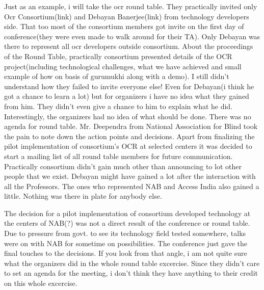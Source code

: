 Just as an example, i will take the ocr round table. They practically invited only Ocr Consortium(link) and Debayan Banerjee(link) from technology developers side. That too most of the consortium members got invite on the first day of conference(they were even made to walk around for their TA). Only Debayan was there to represent all ocr developers outside consortium. About the proceedings of the Round Table, practically consortium presented details of the OCR project(including technological challenges, what we have achieved and small example of how on basis of gurumukhi along with a demo). I still didn't understand how they failed to invite everyone else! Even for Debayan(i think he got a chance to learn a lot) but for organizers i have no idea what they gained from him. They didn't even give a chance to him to explain what he did. Interestingly, the organizers had no idea of what should be done. There was no agenda for round table. Mr. Deependra from National Association for Blind took the pain to note down the action points and decisions. Apart from finalizing the pilot implementation of consortium's OCR at selected centers it was decided to start a mailing list of all round table members for future communication. Practically consortium didn't gain much other than announcing to lot other people that we exist. Debayan might have gained a lot after the interaction with all the Professors. The ones who represented NAB and Access India also gained a little. Nothing was there in plate for anybody else.

The decision for a pilot implementation of consortium developed technology at the centers of NAB(?) was not a direct result of the conference or round table. Due to pressure from govt. to see its technology field tested somewhere, talks were on with NAB for sometime on possibilities. The conference just gave the final touches to the decisions. If you look from that angle, i am not quite sure what the organizers did in the whole round table excercise. Since they didn't care to set an agenda for the meeting, i don't think they have anything to their credit on this whole excercise. 

